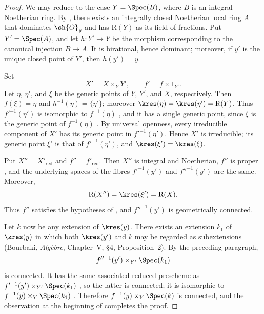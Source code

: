 \begin{proof}
We may reduce to the case $Y=\Spec(B)$, where $B$ is an integral
Noetherian ring.  By , there exists an integrally
closed Noetherian local ring $A$ that dominates $\sh{O}_y$ and has
$\mathrm{R}(Y)$ as its field of fractions.  Put $Y'=\Spec(A)$, and let
$h:Y'\to Y$ be the morphism corresponding to the canonical
injection $B\to A$.  It is birational, hence dominant; moreover, if
$y'$ is the unique closed point of $Y'$, then $h(y')=y$.

Set
\[
  X'=X\times_Y Y',
  \qquad
  f'=f\times 1_{Y'}.
\]
Let $\eta$, $\eta'$, and $\xi$ be the generic points of $Y$, $Y'$,
and $X$, respectively.  Then $f(\xi)=\eta$ and
$h^{-1}(\eta)=\{\eta'\}$; moreover
$\kres(\eta)=\kres(\eta')=\mathrm{R}(Y)$.  Thus $f'^{-1}(\eta')$ is
isomorphic to $f^{-1}(\eta)$ , and it has a single
generic point, since $\xi$ is the generic point of
$f^{-1}(\eta)$ .  By universal openness, every
irreducible component of $X'$ has its generic point in
$f'^{-1}(\eta')$.  Hence $X'$ is irreducible; its generic point
$\xi'$ is that of $f'^{-1}(\eta')$, and
$\kres(\xi')=\kres(\xi)$.


Put $X''=X'_{\mathrm{red}}$ and $f''=f'_{\mathrm{red}}$.  Then
$X''$ is integral and Noetherian, $f''$ is proper
, and the underlying spaces of the fibres
$f'^{-1}(y')$ and $f''^{-1}(y')$ are the same.  Moreover,
\[
  \mathrm{R}(X'')=\kres(\xi')=\mathrm{R}(X).
\]
Thus $f''$ satisfies the hypotheses of , and
$f''^{-1}(y')$ is geometrically connected.

Let $k$ now be any extension of $\kres(y)$.  There exists an
extension $k_1$ of $\kres(y)$ in which both $\kres(y')$ and $k$ may
be regarded as subextensions (Bourbaki, \emph{Alg\`ebre},
Chapter~V, \S4, Proposition~2).  By the preceding paragraph,
\[
  f''^{-1}(y')\times_{Y'}\Spec(k_1)
\]
is connected.  It has the same associated reduced prescheme as
$f'^{-1}(y')\times_{Y'}\Spec(k_1)$
, so the latter is connected; it is isomorphic to
$f^{-1}(y)\times_Y\Spec(k_1)$ .  Therefore
$f^{-1}(y)\times_Y\Spec(k)$ is connected, and the observation at the
beginning of  completes the proof.
\end{proof}

